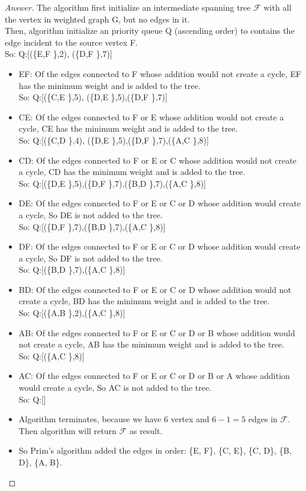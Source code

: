 \documentclass[11pt]{article}
\theoremstyle{definition}
\theoremstyle{definition}
\theoremstyle{definition}
\begin{document}
\begin{proof}[Answer]
The algorithm first initialize an intermediate spanning tree $\mathcal{F}$  with all the vertex in weighted graph G, but no edges in it. \\
Then, algorithm initialize an priority queue Q (ascending order) to contains the edge incident to the source vertex F.\\
So: Q:[(\{E,F \},2), (\{D,F \},7)]
\begin{itemize}
\item EF: Of the edges connected to F whose addition would not create a cycle, EF has the minimum weight and is added to the tree.\\
So: Q:[(\{C,E \},5), (\{D,E \},5),(\{D,F \},7)]
\item CE: Of the edges connected to F or E whose addition would not create a cycle, CE has the minimum weight and is added to the tree.\\
So: Q:[(\{C,D \},4), (\{D,E \},5),(\{D,F \},7),(\{A,C \},8)]
\item CD: Of the edges connected to F or E or C whose addition would not create a cycle, CD has the minimum weight and is added to the tree.\\
So: Q:[(\{D,E \},5),(\{D,F \},7),(\{B,D \},7),(\{A,C \},8)]
\item DE: Of the edges connected to F or E or C or D whose addition would create a cycle, So DE is not added to the tree.\\
So: Q:[(\{D,F \},7),(\{B,D \},7),(\{A,C \},8)]
\item DF: Of the edges connected to F or E or C or D whose addition would create a cycle, So DF is not added to the tree.\\
So: Q:[(\{B,D \},7),(\{A,C \},8)]
\item BD: Of the edges connected to F or E or C or D whose addition would not create a cycle, BD has the minimum weight and is added to the tree.\\
So: Q:[(\{A,B \},2),(\{A,C \},8)]
\item AB: Of the edges connected to F or E or C or D or B whose addition would not create a cycle,  AB has the minimum weight and is added to the tree.\\
So: Q:[(\{A,C \},8)]
\item AC: Of the edges connected to F or E or C or D or B or A whose addition would create a cycle, So AC is not added to the tree.\\
So: Q:[]
\item Algorithm terminates, because we have $6$ vertex and $6-1 = 5$ edges in  $\mathcal{F}$. Then algorithm will return $\mathcal{F}$ as result.
\item So Prim's algorithm added the edges in order: \{E, F\}, \{C, E\}, \{C, D\}, \{B, D\}, \{A, B\}.
\end{itemize}
\end{proof}




\end{document}
